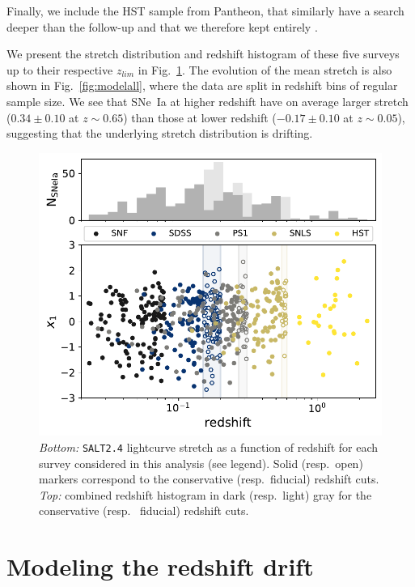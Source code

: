 \documentclass[]{aa} %
\begin{document}
Finally, we include the HST sample from Pantheon, that similarly have a search
deeper than the follow-up and that we therefore kept entirely
\citep{strolger04}.

We present the stretch distribution and redshift histogram of these five surveys
up to their respective $z_{lim}$ in Fig.~\ref{fig:sample}. The evolution of
the mean stretch is also shown in Fig.~\ref{fig:modelall}, where the data are
split in redshift bins of regular sample size. We see that SNe~Ia at higher
redshift have on average larger stretch ($0.34 \pm 0.10$ at $z\sim0.65$) than
those at lower redshift ($-0.17\pm 0.10$ at $z\sim0.05$), suggesting that the
underlying stretch distribution is drifting.

\begin{figure}
    \centering
    \includegraphics[width=0.95\linewidth]{Article_figures/stretchs-cut_btw_hist_cumu_75-lb-cividis.pdf}

    \caption{\textit{Bottom:} \textsc{\texttt{SALT2.4}} lightcurve stretch as a
        function of redshift for each survey considered in this analysis (see
        legend). Solid (resp.\ open) markers correspond to the conservative
        (resp.\ fiducial) redshift cuts. \textit{Top:} combined redshift
        histogram in dark (resp.\ light) gray for the conservative (resp.
        \ fiducial) redshift cuts.}

    \label{fig:sample}
\end{figure}

\section{Modeling the redshift drift}\label{sec:modeling}
\end{document}
